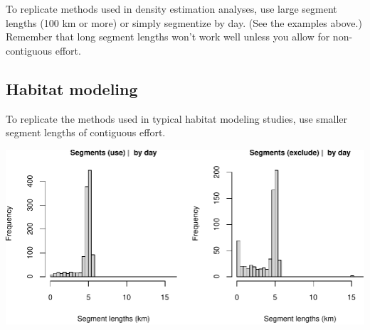 \documentclass[
]{book}
\newenvironment{Shaded}{\begin{snugshade}}{\end{snugshade}}
\newcommand{\CommentTok}[1]{\textcolor[rgb]{0.56,0.35,0.01}{\textit{#1}}}
\newcommand{\DataTypeTok}[1]{\textcolor[rgb]{0.13,0.29,0.53}{#1}}
\newcommand{\DecValTok}[1]{\textcolor[rgb]{0.00,0.00,0.81}{#1}}
\newcommand{\FloatTok}[1]{\textcolor[rgb]{0.00,0.00,0.81}{#1}}
\newcommand{\KeywordTok}[1]{\textcolor[rgb]{0.13,0.29,0.53}{\textbf{#1}}}
\newcommand{\NormalTok}[1]{#1}
\newcommand{\OperatorTok}[1]{\textcolor[rgb]{0.81,0.36,0.00}{\textbf{#1}}}
\newcommand{\OtherTok}[1]{\textcolor[rgb]{0.56,0.35,0.01}{#1}}
\newcommand{\StringTok}[1]{\textcolor[rgb]{0.31,0.60,0.02}{#1}}
\begin{document}
To replicate methods used in density estimation analyses, use large segment lengths (100 km or more) or simply segmentize by day. (See the examples above.) Remember that long segment lengths won't work well unless you allow for non-contiguous effort.

\hypertarget{habitat-modeling}{%
\subsection*{Habitat modeling}\label{habitat-modeling}}

To replicate the methods used in typical habitat modeling studies, use smaller segment lengths of contiguous effort.

\begin{Shaded}
\end{Shaded}

\includegraphics{figures/unnamed-chunk-275-1.pdf}
\end{document}
